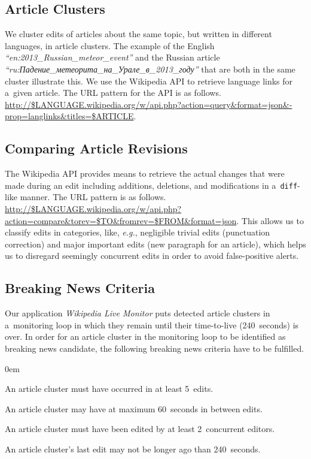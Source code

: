 \documentclass{www13-companion-accepted}
\newcommand{\inlinelistingsize}{\fontsize{8pt}{11pt}}
\let\oldurl\url
\renewcommand{\url}[1]{\inlinelistingsize\oldurl{#1}}
\begin{document}
\subsection{Article Clusters}

We cluster edits of articles about the same topic,
but written in different languages, in article clusters.
The example of the English
\emph{``en:2013\_Russian\_meteor\_event''}
and the Russian article \selectfont
\emph{``ru:Падение\_метеорита\_на\_Урале\_в\_2013\_году''}
\selectfont that are both in the same cluster illustrate this.
We use the Wikipedia API to retrieve language links for a~given article.
The URL pattern for the API is as follows.
\url{http://$LANGUAGE.wikipedia.org/w/api.php?action=query&format=json&-prop=langlinks&titles=$ARTICLE}.

\subsection{Comparing Article Revisions}
\label{sec:comparing-article-revisions}

The Wikipedia API provides means to retrieve the actual changes
that were made during an edit including additions, deletions,
and modifications in a~\texttt{diff}-like manner.
The URL pattern is as follows.
\url{http://$LANGUAGE.wikipedia.org/w/api.php?action=compare&torev=$TO&fromrev=$FROM&format=json}. %
This allows us to classify edits in categories, like, \emph{e.g.},
negligible trivial edits (punctuation correction) and 
major important edits (new paragraph for an article),
which helps us to disregard seemingly concurrent edits
in order to avoid false-positive alerts.

\subsection{Breaking News Criteria}

Our application \emph{Wikipedia Live Monitor} puts  
detected article clusters in a~monitoring loop in which they remain
until their time-to-live (240~seconds) is over.
In order for an article cluster in the monitoring loop
to be identified as breaking news candidate,
the following breaking news criteria have to be fulfilled.

\begin{description}
  \itemsep0em
  \item[$\geq$~5~Occurrences:] An article cluster must have occurred
  in at least 5~edits.
  \item[$\leq$~60~Seconds Between Edits:] An article cluster may have
  at maximum 60~seconds in between edits.
  \item[$\geq$~2~Concurrent Editors:] An article cluster must have been edited
  by at least 2~concurrent editors.
  \item[$\leq$~240~Seconds Since Last Edit:] An article cluster's last edit
  may not be longer ago than 240~seconds.
\end{description}
\end{document}
